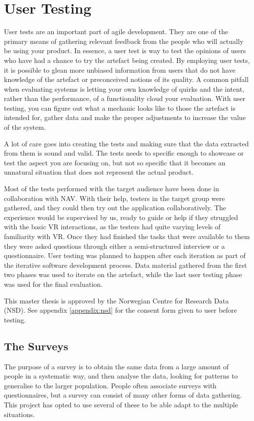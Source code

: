 \section{User Testing}
User tests are an important part of agile development. They are one of the primary means of gathering relevant feedback from the people who will actually be using your product. In essence, a user test is way to test the opinions of users who have had a chance to try the artefact being created. By employing user tests, it is possible to glean more unbiased information from users that do not have knowledge of the artefact or preconceived notions of its quality. A common pitfall when evaluating systems is letting your own knowledge of quirks and the intent, rather than the performance, of a functionality cloud your evaluation. With user testing, you can figure out what a mechanic looks like to those the artefact is intended for, gather data and make the proper adjustments to increase the value of the system.

A lot of care goes into creating the tests and making sure that the data extracted from them is sound and valid. The tests needs to specific enough to showcase or test the aspect you are focusing on, but not so specific that it becomes an unnatural situation that does not represent the actual product.


Most of the tests performed with the target audience have been done in collaboration with NAV. With their help, testers in the target group were gathered, and they could then try out the application collaboratively. The experience would be supervised by us, ready to guide or help if they struggled with the basic VR interactions, as the testers had quite varying levels of familiarity with VR. Once they had finished the tasks that were available to them they were asked questions through either a semi-structured interview or a questionnaire. User testing was planned to happen after each iteration as part of the iterative software development process. Data material gathered from the first two phases was used to iterate on the artefact, while the last user testing phase was used for the final evaluation.

This master thesis is approved by the Norwegian Centre for Research Data (NSD). See appendix \ref{appendix:nsd} for the consent form given to user before testing.



\subsection{The Surveys}
The purpose of a survey is to obtain the same data from a large amount of people in a systematic way, and then analyse the data, looking for patterns to generalise to the larger population\cite{oates2005researching}. People often associate surveys with questionnaires, but a survey can consist of many other forms of data gathering. This project has opted to use several of these to be able adapt to the multiple situations. 

